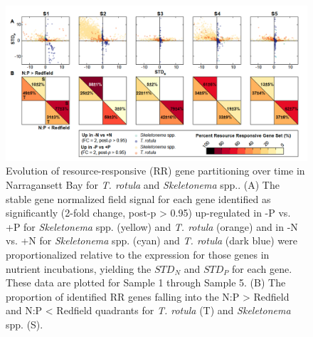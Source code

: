 \begin{figure}[h!]
  \centering
    \includegraphics[width=1\textwidth]{Images/C3_Figure5_Quadrants.png}
    \caption[Evolution of resource-responsive (RR) gene partitioning over time in Narragansett Bay]{Evolution of resource-responsive (RR) gene partitioning over time in Narragansett Bay for \textit{T. rotula} and \textit{Skeletonema} spp.. (A) The stable gene normalized field signal for each gene identified as significantly (2-fold change, post-p > 0.95) up-regulated in -P vs. +P for \textit{Skeletonema} spp. (yellow) and \textit{T. rotula} (orange) and in -N vs. +N for \textit{Skeletonema} spp. (cyan) and \textit{T. rotula} (dark blue) were proportionalized relative to the expression for those genes in nutrient incubations, yielding the $STD_N$ and $STD_P$ for each gene. These data are plotted for Sample 1 through Sample 5. (B) The proportion of identified RR genes falling into the N:P > Redfield and N:P < Redfield quadrants for \textit{T. rotula} (T) and \textit{Skeletonema} spp. (S).}

  \label{fig:c3f5}
\end{figure}

